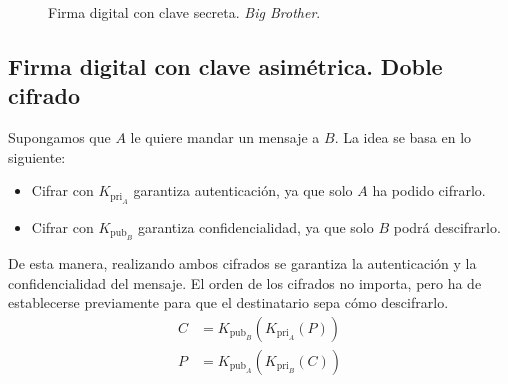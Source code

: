\begin{figure}
    \centering
    \caption{Firma digital con clave secreta. \emph{Big Brother}.}
    \label{fig:big-brother}
\end{figure}


\subsection{Firma digital con clave asimétrica. Doble cifrado}

Supongamos que $A$ le quiere mandar un mensaje a $B$. La idea se basa en lo siguiente:
\begin{itemize}
    \item Cifrar con $K_{\text{pri}_A}$ garantiza autenticación, ya que solo $A$ ha podido cifrarlo.
    \item Cifrar con $K_{\text{pub}_B}$ garantiza confidencialidad, ya que solo $B$ podrá descifrarlo.
\end{itemize}
De esta manera, realizando ambos cifrados se garantiza la autenticación y la confidencialidad del mensaje. El orden de los cifrados no importa, pero ha de establecerse previamente para que el destinatario sepa cómo descifrarlo.
\begin{align*}
    C&=K_{\text{pub}_B}\left(K_{\text{pri}_A}(P)\right)\\
    P&=K_{\text{pub}_A}\left(K_{\text{pri}_B}(C)\right)
\end{align*}

